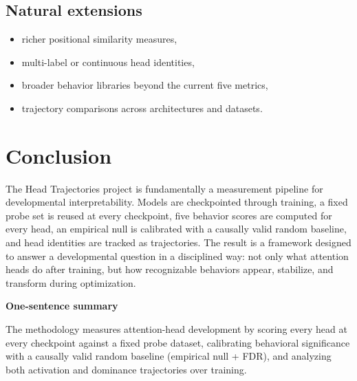 \documentclass[11pt]{article}
\newcommand{\1}{\mathbf{1}}
\begin{document}
\subsection{Natural extensions}

\begin{itemize}
\item richer positional similarity measures,
\item multi-label or continuous head identities,
\item broader behavior libraries beyond the current five metrics,
\item trajectory comparisons across architectures and datasets.
\end{itemize}

\section{Conclusion}

The Head Trajectories project is fundamentally a measurement pipeline for
developmental interpretability. Models are checkpointed through training, a
fixed probe set is reused at every checkpoint, five behavior scores are
computed for every head, an empirical null is calibrated with a causally valid
random baseline, and head identities are tracked as trajectories. The result is a
framework designed to answer a developmental question in a disciplined way: not
only what attention heads do after training, but how recognizable behaviors
appear, stabilize, and transform during optimization.

\vspace{0.8em}
\begin{abstractbox}
{\sffamily\bfseries\color{Ink} One-sentence summary}

The methodology measures attention-head development by scoring every head at
every checkpoint against a fixed probe dataset, calibrating behavioral
significance with a causally valid random baseline (empirical null + FDR), and
analyzing both activation and dominance trajectories over training.
\end{abstractbox}
\end{document}
